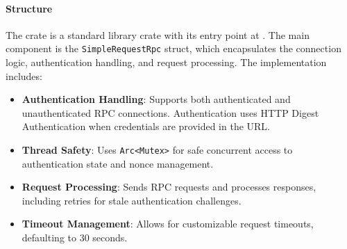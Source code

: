 \paragraph{Structure}
The crate is a standard library crate with its entry point at .  The main component is the \texttt{SimpleRequestRpc} struct, which encapsulates the connection logic, authentication handling, and request processing.  The implementation includes:
\begin{itemize}
    \item \textbf{Authentication Handling}: Supports both authenticated and unauthenticated RPC connections.  Authentication uses HTTP Digest Authentication when credentials are provided in the URL. %
    \item \textbf{Thread Safety}: Uses \texttt{Arc<Mutex>} for safe concurrent access to authentication state and nonce management. %
    \item \textbf{Request Processing}: Sends RPC requests and processes responses, including retries for stale authentication challenges. %
    \item \textbf{Timeout Management}: Allows for customizable request timeouts, defaulting to 30 seconds. %
\end{itemize}

